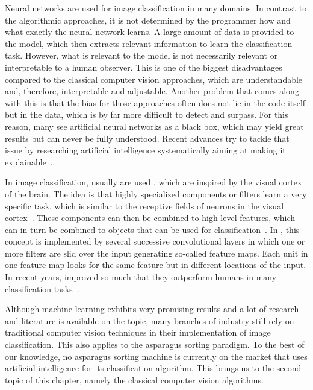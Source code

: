 \bigskip
Neural networks are used for image classification in many domains. In contrast to the algorithmic approaches, it is not determined by the programmer how and what exactly the neural network learns. A large amount of data is provided to the model, which then extracts relevant information to learn the classification task. However, what is relevant to the model is not necessarily relevant or interpretable to a human observer. This is one of the biggest disadvantages compared to the classical computer vision approaches, which are understandable and, therefore, interpretable and adjustable. Another problem that comes along with this is that the bias for those approaches often does not lie in the code itself but in the data, which is by far more difficult to detect and surpass. For this reason, many see artificial neural networks as a black box, which may yield great results but can never be fully understood. Recent advances try to tackle that issue by researching artificial intelligence systematically aiming at making it explainable~\citep{tjoa2019survey,gilpin2018explaining}.

In image classification, usually  are used \citep{geron2019hands,lecun1995convolutional}, which are inspired by the visual cortex of the brain. The idea is that highly specialized components or filters learn a very specific task, which is similar to the receptive fields of neurons in the visual cortex~\citep{hubel1962receptive}. These components can then be combined to high-level features, which can in turn be combined to objects that can be used for classification~\citep{geron2019hands,bishop2006pattern,lecun1995convolutional}. In , this concept is implemented by several successive convolutional layers in which one or more filters are slid over the input generating so-called feature maps. Each unit in one feature map looks for the same feature but in different locations of the input. In recent years,  improved so much that they outperform humans in many classification tasks~\citep{russakovsky2015imagenet,KarpathyConvNet}.

\bigskip
Although machine learning exhibits very promising results and a lot of research and literature is available on the topic, many branches of industry still rely on traditional computer vision techniques in their implementation of image classification. This also applies to the asparagus sorting paradigm. To the best of our knowledge, no asparagus sorting machine is currently on the market that uses artificial intelligence for its classification algorithm. This brings us to the second topic of this chapter, namely the classical computer vision algorithms.


